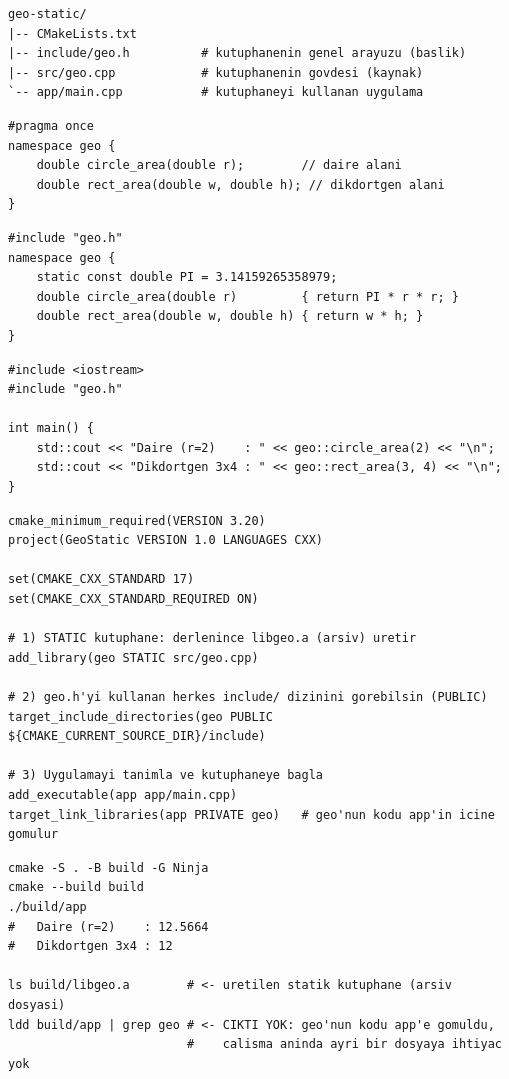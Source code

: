 \documentclass[11pt,a4paper]{article}
\begin{document}
\begin{lstlisting}[style=shstyle]
geo-static/
|-- CMakeLists.txt
|-- include/geo.h          # kutuphanenin genel arayuzu (baslik)
|-- src/geo.cpp            # kutuphanenin govdesi (kaynak)
`-- app/main.cpp           # kutuphaneyi kullanan uygulama
\end{lstlisting}

\begin{lstlisting}[style=cppstyle,title={\color{ortaGri}\ttfamily include/geo.h}]
#pragma once
namespace geo {
    double circle_area(double r);        // daire alani
    double rect_area(double w, double h); // dikdortgen alani
}
\end{lstlisting}

\begin{lstlisting}[style=cppstyle,title={\color{ortaGri}\ttfamily src/geo.cpp}]
#include "geo.h"
namespace geo {
    static const double PI = 3.14159265358979;
    double circle_area(double r)         { return PI * r * r; }
    double rect_area(double w, double h) { return w * h; }
}
\end{lstlisting}

\begin{lstlisting}[style=cppstyle,title={\color{ortaGri}\ttfamily app/main.cpp}]
#include <iostream>
#include "geo.h"

int main() {
    std::cout << "Daire (r=2)    : " << geo::circle_area(2) << "\n";
    std::cout << "Dikdortgen 3x4 : " << geo::rect_area(3, 4) << "\n";
}
\end{lstlisting}

\begin{lstlisting}[title={\color{ortaGri}\ttfamily CMakeLists.txt}]
cmake_minimum_required(VERSION 3.20)
project(GeoStatic VERSION 1.0 LANGUAGES CXX)

set(CMAKE_CXX_STANDARD 17)
set(CMAKE_CXX_STANDARD_REQUIRED ON)

# 1) STATIC kutuphane: derlenince libgeo.a (arsiv) uretir
add_library(geo STATIC src/geo.cpp)

# 2) geo.h'yi kullanan herkes include/ dizinini gorebilsin (PUBLIC)
target_include_directories(geo PUBLIC ${CMAKE_CURRENT_SOURCE_DIR}/include)

# 3) Uygulamayi tanimla ve kutuphaneye bagla
add_executable(app app/main.cpp)
target_link_libraries(app PRIVATE geo)   # geo'nun kodu app'in icine gomulur
\end{lstlisting}

\begin{lstlisting}[style=shstyle]
cmake -S . -B build -G Ninja
cmake --build build
./build/app
#   Daire (r=2)    : 12.5664
#   Dikdortgen 3x4 : 12

ls build/libgeo.a        # <- uretilen statik kutuphane (arsiv dosyasi)
ldd build/app | grep geo # <- CIKTI YOK: geo'nun kodu app'e gomuldu,
                         #    calisma aninda ayri bir dosyaya ihtiyac yok
\end{lstlisting}
\end{document}
